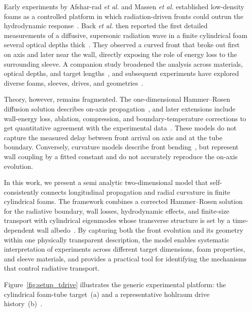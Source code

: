 \documentclass[prl, twocolumn, superscriptaddress, amsmath, amssymb, reprint]{revtex4-2}
\begin{document}
Early experiments by Afshar-rad \textit{et al.} and Massen \textit{et al.} established low-density foams as a controlled platform in which radiation-driven fronts could outrun the hydrodynamic response~\cite{AfsharRad1994,Massen1994}. Back \textit{et al.} then reported the first detailed measurements of a diffusive, supersonic radiation wave in a finite cylindrical foam several optical depths thick~\cite{Back2000PRL}. They observed a curved front that broke out first on axis and later near the wall, directly exposing the role of energy loss to the surrounding sleeve. A companion study broadened the analysis across materials, optical depths, and target lengths~\cite{Back2000POP}, and subsequent experiments have explored diverse foams, sleeves, drives, and geometries~\cite{Jiang2005,Keiter2008,Zhang2010,Moore2015,Courtois2024}.

Theory, however, remains fragmented. The one-dimensional Hammer--Rosen diffusion solution describes on-axis propagation~\cite{Hammer2003}, and later extensions include wall-energy loss, ablation, compression, and boundary-temperature corrections to get quantitative agreement with the experimental data~\cite{Cohen2018,Cohen2020Key}. These models do not capture the measured delay between front arrival on axis and at the tube boundary. Conversely, curvature models describe front bending~\cite{Hurricane2006,Courtois2022}, but represent wall coupling by a fitted constant and do not accurately reproduce the on-axis evolution.

In this work, we present a semi analytic two-dimensional model that self-consistently connects longitudinal propagation and radial curvature in finite cylindrical foams. The framework combines a corrected Hammer--Rosen solution for the radiative boundary, wall losses, hydrodynamic effects, and finite-size transport with cylindrical eigenmodes whose transverse structure is set by a time-dependent wall albedo~\cite{Hurricane2006,Courtois2022}. By capturing both the front evolution and its geometry within one physically transparent description, the model enables systematic interpretation of experiments across different target dimensions, foam properties, and sleeve materials, and provides a practical tool for identifying the mechanisms that control radiative transport.

Figure~\ref{fig:setup_tdrive} illustrates the generic experimental platform: the cylindrical foam-tube target~(a) and a representative hohlraum drive history~(b)~\cite{Back2000PRL}.
\endgroup
\end{document}
